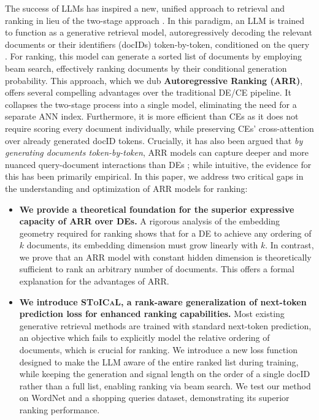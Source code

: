 \documentclass[11pt, a4paper, onecolumn, confidential, copyright, gdm]{google}
\begin{document}
The success of LLMs has inspired a new, unified approach to retrieval and ranking in lieu of the two-stage approach \citep{metzler2021rethinking,li2023large,lee2024can}. 
In this paradigm, an LLM is trained to function as a generative retrieval model, autoregressively decoding the relevant documents or their identifiers (docIDs) token-by-token, conditioned on the query \citep{tay2022transformer}. For ranking, this model can generate a sorted list of documents by employing beam search, effectively ranking documents by their conditional generation probability. 
This approach, which we dub \textbf{Autoregressive Ranking (ARR)}, offers several compelling advantages over the traditional DE/CE pipeline. It collapses the two-stage process into a single model, eliminating the need for a separate ANN index. Furthermore, it is more efficient than CEs as it does not require scoring every document individually, while preserving CEs' cross-attention over already generated docID tokens. Crucially, it has also been argued that \textit{by generating documents token-by-token}, ARR models can capture deeper and more nuanced query-document interactions than DEs \citep{yuan2024generative}; while intuitive, the evidence for this has been primarily empirical. In this paper, we address two critical gaps in the understanding and optimization of ARR models for ranking:

\begin{itemize}[align=left,leftmargin=*,itemsep=0pt,topsep=0pt]
    \item \textbf{We provide a theoretical foundation for the superior expressive capacity of ARR over DEs.} A rigorous analysis of the embedding geometry required for ranking shows that for a DE to achieve any ordering of $k$ documents, its embedding dimension must grow linearly with $k$. In contrast, we prove that an ARR model with constant hidden dimension is theoretically sufficient to rank an arbitrary number of documents. This offers a formal explanation for the advantages of ARR.
    \item \textbf{We introduce \textsc{SToICaL}, a rank-aware generalization of next-token prediction loss for enhanced ranking capabilities.} Most existing generative retrieval methods are trained with standard next-token prediction, an objective which fails to explicitly model the relative ordering of documents, which is crucial for ranking. We introduce a new loss function designed to make the LLM aware of the entire ranked list during training, while keeping the generation and signal length on the order of a single docID rather than a full list, enabling ranking via beam search. 
    We test our method on WordNet and a shopping queries dataset, demonstrating its superior ranking performance. 
\end{itemize}
\end{document}
